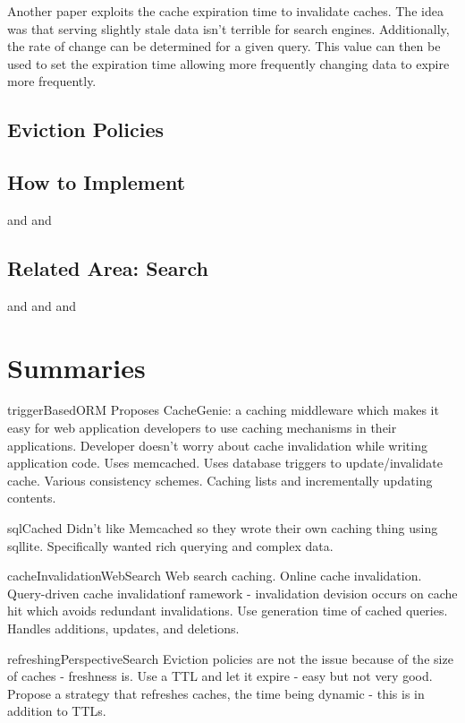 \documentclass[12pt]{article}
\begin{document}
Another paper exploits the cache expiration time to invalidate caches. \cite{refreshingPerspectiveSearch}
The idea was that serving slightly stale data isn't terrible for search engines.
Additionally, the rate of change can be determined for a given query.
This value can then be used to set the expiration time allowing more frequently changing data to expire more frequently.

\subsection{Eviction Policies}

\subsection{How to Implement}
\cite{triggerBasedORM} and \cite{keyBasedCacheExpiration} and \cite{scalableConsistentCaching}

\subsection{Related Area: Search}
\cite{cacheInvalidationWebSearch} and \cite{refreshingPerspectiveSearch} and \cite{cacheAdmissionPolicies} and \cite{designTradeOffsSearchEngine}


\section{Summaries}
triggerBasedORM \cite{triggerBasedORM}
Proposes CacheGenie: a caching middleware which makes it easy for web application developers to use caching mechanisms in their applications.
Developer doesn't worry about cache invalidation while writing application code.
Uses memcached.
Uses database triggers to update/invalidate cache.
Various consistency schemes.
Caching lists and incrementally updating contents.

sqlCached \cite{sqlCached}
Didn't like Memcached so they wrote their own caching thing using sqllite.
Specifically wanted rich querying and complex data.

cacheInvalidationWebSearch \cite{cacheInvalidationWebSearch}
Web search caching.
Online cache invalidation.
Query-driven cache invalidationf ramework - invalidation devision occurs on cache hit which avoids redundant invalidations.
Use generation time of cached queries.
Handles additions, updates, and deletions.

refreshingPerspectiveSearch \cite{refreshingPerspectiveSearch}
Eviction policies are not the issue because of the size of caches - freshness is.
Use a TTL and let it expire - easy but not very good.
Propose a strategy that refreshes caches, the time being dynamic - this is in addition to TTLs.
\end{document}

